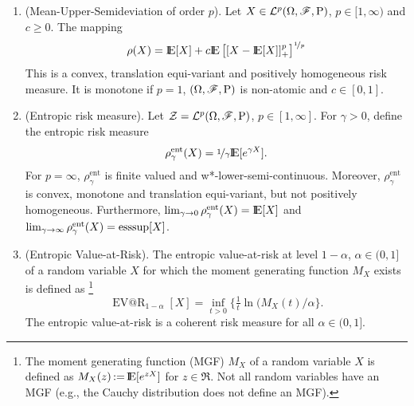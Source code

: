 \documentclass[a4paper,10pt]{article}
\begin{document}
\begin{enumerate}
 \item (Mean-Upper-Semideviation of order $p$). Let $X\in\mathcal{L}^p(\Omega,\mathscr{F},\mathrm{P})$, $p\in[1,\infty)$ 
       and $c\geq 0$. The mapping
       \[
        \rho(X) = \E[X] + c \E\left[ [X-\E[X]]_+^p\right]^{\nicefrac{1}{p}}
       \]
       This is a convex, translation equi-variant and positively homogeneous risk measure.
       It is monotone if $p=1$, $(\Omega,\mathscr{F},\mathrm{P})$ is non-atomic and $c\in[0,1]$.
       
 \item (Entropic risk measure). Let $\mathcal{Z}=\mathcal{L}^p(\Omega,\mathscr{F},\mathrm{P})$, $p\in[1,\infty]$.
       For $\gamma>0$, define the entropic risk measure
       \[
        \rho^{\mathrm{ent}}_\gamma(X)= \nicefrac{1}{\gamma}\E[e^{\gamma X}].
       \]
       For $p=\infty$, $\rho^{\mathrm{ent}}_\gamma$ is finite valued and w*-lower-semi-continuous.
       Moreover, $\rho^{\mathrm{ent}}_\gamma$ is convex, monotone and translation
       equi-variant, but not positively homogeneous.
       Furthermore, $\lim_{\gamma \to 0}\rho^{\mathrm{ent}}_\gamma(X) = \E[X]$ and 
       $\lim_{\gamma \to \infty}\rho^{\mathrm{ent}}_\gamma(X) = \operatorname*{ess\!\sup}[X]$.
       
 \item (Entropic Value-at-Risk). The entropic value-at-risk at level $1-\alpha$, $\alpha\in(0,1]$ of a random 
       variable $X$ for which the moment generating function $M_X$ exists is defined as%
	  \footnote{The moment generating function (MGF) $M_X$ of a random variable $X$ is defined 
	            as $M_X(z) \dfn \E[e^{zX}]$ for $z\in\Re$. Not all random variables have an MGF 
	            (e.g., the Cauchy distribution does not define an MGF).%
	            }
       \[
        \operatorname{EV@R}_{1-\alpha}[X] = \inf_{t>0}\{\tfrac{1}{t}\ln(M_X(t)/\alpha\}.
       \]
       The entropic value-at-risk is a coherent risk measure for all $\alpha\in(0,1]$.
       

\end{enumerate}
\end{document}
